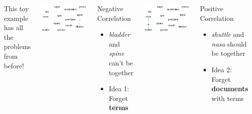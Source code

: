 {\begin{columns}
		 {  This toy example has all the problems from before!  }
		\only<2-6> {

		\includegraphics[width=\linewidth]{interactive_topic_models/constraints_4}

		\begin{block}{Negative Correlation}

		\begin{itemize}
			\item \emph{bladder} and \emph{spine} can't be together
			\item Idea 1: Forget {\bf terms}
		\end{itemize}


		\end{block}

		}

		 {

		\includegraphics[width=\linewidth]{interactive_topic_models/constraints_5}

		\begin{block}{Positive Correlation}
		\begin{itemize}
			\item \emph{shuttle} and \emph{nasa} should be together
			\item Idea 2: Forget {\bf documents} with terms
		\end{itemize}
		\end{block}

		}

	\end{columns}

}


